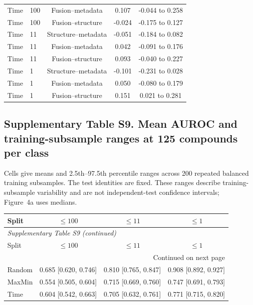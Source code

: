 \begin{longtable}{llccc}
Time & 100 & Fusion--metadata & 0.107 & -0.044 to 0.258 \\
Time & 100 & Fusion--structure & -0.024 & -0.175 to 0.127 \\
Time & 11 & Structure--metadata & -0.051 & -0.184 to 0.082 \\
Time & 11 & Fusion--metadata & 0.042 & -0.091 to 0.176 \\
Time & 11 & Fusion--structure & 0.093 & -0.040 to 0.227 \\
Time & 1 & Structure--metadata & -0.101 & -0.231 to 0.028 \\
Time & 1 & Fusion--metadata & 0.050 & -0.080 to 0.179 \\
Time & 1 & Fusion--structure & 0.151 & 0.021 to 0.281 \\
\end{longtable}
\subsection*{Supplementary Table S9. Mean AUROC and training-subsample ranges at 125 compounds per class}
Cells give means and 2.5th--97.5th percentile ranges across 200 repeated balanced training subsamples. The test identities are fixed. These ranges describe training-subsample variability and are not independent-test confidence intervals; Figure~4a uses medians.
\begin{longtable}{lccc}

\toprule Split & $\leq100$ & $\leq11$ & $\leq1$ \\ \midrule\endfirsthead
\multicolumn{4}{l}{\textit{Supplementary Table S9 (continued)}} \\
\toprule Split & $\leq100$ & $\leq11$ & $\leq1$ \\ \midrule\endhead
\midrule\multicolumn{4}{r}{Continued on next page}\\\endfoot
\bottomrule\endlastfoot
Random & 0.685 [0.620, 0.746] & 0.810 [0.765, 0.847] & 0.908 [0.892, 0.927] \\
MaxMin & 0.554 [0.505, 0.604] & 0.715 [0.669, 0.760] & 0.747 [0.691, 0.793] \\
Time & 0.604 [0.542, 0.663] & 0.705 [0.632, 0.761] & 0.771 [0.715, 0.820] \\
\end{longtable}
